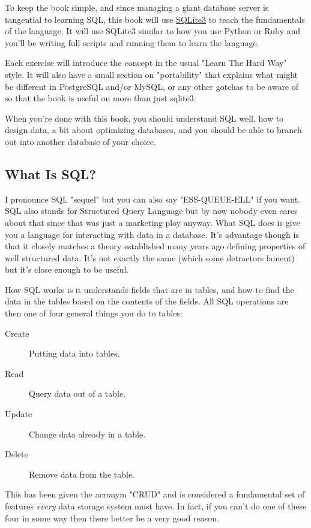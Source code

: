 To keep the book simple, and since managing a giant database server is tangential
to learning SQL, this book will use \href{http://sqlite.org}{SQLite3} to teach
the fundamentals of the language.  It will use SQLite3 similar to how you use
Python or Ruby and you'll be writing full  scripts and running them
to learn the language.  

Each exercise will introduce the concept in the usual "Learn The Hard Way" style.
It will also have a small section on "portability" that explains what might be
different in PostgreSQL and/or MySQL, or any other gotchas to be aware of so that
the book is useful on more than just sqlite3.

When you're done with this book, you should understand SQL well, how to design
data, a bit about optimizing databases, and you should be able to branch out into
another database of your choice.

\subsection*{What Is SQL?}

I pronounce SQL "sequel" but you can also say "ESS-QUEUE-ELL" if you want. SQL
also stands for Structured Query Language but by now nobody even cares about
that since that was just a marketing ploy anyway. What SQL does is give you a
language for interacting with data in a database.  It's advantage though is
that it closely matches a theory established many years ago defining properties
of well structured data.  It's not exactly the same (which some detractors
lament) but it's close enough to be useful.

How SQL works is it understands fields that are in tables, and how to find the
data in the tables based on the contents of the fields.  All SQL operations are
then one of four general things you do to tables:

\begin{description}
\item[Create] Putting data into tables.
\item[Read] Query data out of a table.
\item[Update] Change data already in a table.
\item[Delete] Remove data from the table.
\end{description}

This has been given the acronym "CRUD" and is considered a fundamental set of
features \emph{every} data storage system must have.  In fact, if you can't do 
one of these four in some way then there better be a very good reason.

